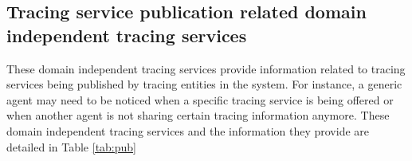 		\subsection{Tracing service publication related domain independent tracing services}

			These domain independent tracing services provide information related to tracing services
			being published by tracing entities in the system. For instance, a generic agent may need to
			be noticed when a specific tracing service is being offered or when another agent is not
			sharing certain tracing information anymore. These domain independent tracing services
			and the information they provide are detailed in Table \ref{tab:pub}


